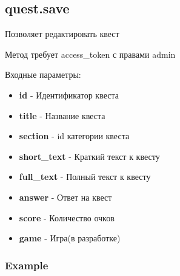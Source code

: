 \subsection{quest.save}
Позволяет редактировать квест

Метод требует access\_token с правами admin

Входные параметры:
\begin{itemize}
  \item \textbf{id} - Идентификатор квеста
  \item \textbf{title} - Название квеста
  \item \textbf{section} - id категории квеста
  \item \textbf{short\_text} - Краткий текст к квесту
  \item \textbf{full\_text} - Полный текст к квесту
  \item \textbf{answer} - Ответ на квест
  \item \textbf{score} - Количество очков
  \item \textbf{game} - Игра(в разработке)
\end{itemize}

\subsubsection{Example}
\begin{Verbatim}[frame=single]

\end{Verbatim}